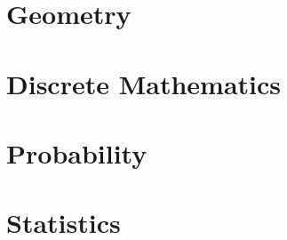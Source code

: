 \documentclass{book}
\theoremstyle{plain}
\theoremstyle{definition}
\numberwithin{equation}{section}
\begin{document}
\part{Geometry}




%
\part{Discrete Mathematics}


\part{Probability}


	




\part{Statistics}




\end{document}
